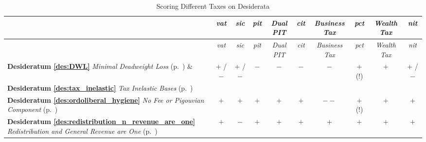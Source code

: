 \begin{landscape}
\begin{longtabu}{p{4cm}ccccccccc}
\caption[Scoring Different Taxes on Desiderata]{Scoring Different Taxes on Desiderata}\\ \toprule  &\emph{vat}	&\emph{sic}	&\emph{pit}		&\emph{Dual PIT}	&\emph{cit}	&\emph{Business Tax}	&\emph{pct}	&\emph{Wealth Tax} 	&\emph{nit}\vspace{15pt} \\  \midrule \endfirsthead

\toprule
 &\emph{vat}	&\emph{sic}	&\emph{pit}		&\emph{Dual PIT}	&\emph{cit}	&\emph{Business Tax}	&\emph{pct}	&\emph{Wealth Tax} 	&\emph{nit}\vspace{15pt} \\ \midrule \endhead

\textbf{Desideratum \ref{des:DWL}} \emph{Minimal Deadweight Loss} (p.~\pageref{des:DWL}) \&
&$+$ / $-$		&$+$ /$-$		&$-$				&$-$			&$-$			&$-$				&$+$ (!)		&$+$				&$+$ / $-$\\
\textbf{Desideratum \ref{des:tax_inelastic}} \emph{Tax Inelastic Bases} (p.~\pageref{des:tax_inelastic}) \vspace{10pt}
&			&			&				&			&			&				&			&				&\\
\textbf{Desideratum \ref{des:ordoliberal_hygiene}} \emph{No Fee or Pigouvian Component} (p.~\pageref{des:ordoliberal_hygiene}) \vspace{10pt}
&$+$ 			&$+$			&$+$				&$+$			&$+$			&$--$				&$+$ (!)		&$+$				&$+$\\%

\textbf{Desideratum \ref{des:redistribution_n_revenue_are_one}} \emph{Redistribution and General Revenue are One} (p.~\pageref{des:redistribution_n_revenue_are_one}) \vspace{10pt}
&$+$ 			&$-$			&$+$				&$+$			&$+$			&$+$				&$+$			&$+$				&$+$\\%


\end{longtabu}
\end{landscape}
